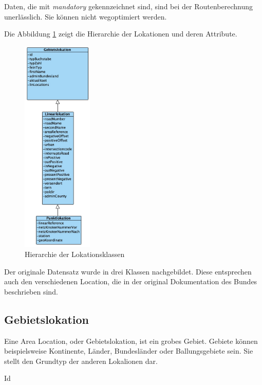 \documentclass[12pt, a4paper, ngerman]{article}
\begin{document}
Daten, die mit \textit{mandatory} gekennzeichnet sind, sind bei der Routenberechnung unerlässlich. Sie können nicht wegoptimiert werden.

Die Abbildung \ref{fig:klassendiagrammLokations} zeigt die Hierarchie der Lokationen und deren Attribute.

\begin{figure}[htbp] 
  \centering
     \includegraphics[width=0.3\textwidth]{Grafiken/klassenDiagrammLokations.jpg}
  \caption{Hierarchie der Lokationsklassen}
  \label{fig:klassendiagrammLokations}
\end{figure}

Der originale Datensatz wurde in drei Klassen nachgebildet. Diese entsprechen auch den verschiedenen Location, die in der original Dokumentation des Bundes beschrieben sind.
\subsection{Gebietslokation \label{AreaLocation}}
Eine Area Location, oder Gebietslokation, ist ein grobes Gebiet. Gebiete können beispielsweise Kontinente, Länder, Bundesländer oder Ballungsgebiete sein. Sie stellt den Grundtyp der anderen Lokalionen dar.

\begin{attribut}{Id}
\end{attribut}
\end{document}
